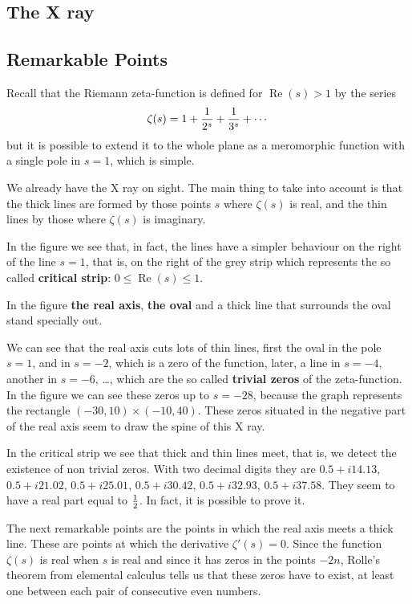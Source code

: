 \documentclass[a4paper]{amsart}
\numberwithin{equation}{section}
\def\Re{\operatorname{\text{Re}}}
\begin{document}
\begin{large}
\section{The X ray}

\subsection{Remarkable Points} 
Recall that the Riemann zeta-function is defined
for
$\Re (s) >1$ by the series
$$\zeta(s)=1+{1\over 2^s}+{1\over 3^s}+\cdots$$
but it is possible to extend it to the whole plane as a meromorphic function
with a single pole in $s=1$, which is simple.

We already have the X ray on sight. The main thing to take into account
is that the thick lines are formed by those points $s$ where $\zeta
(s)$ is real, and the thin lines by those where $\zeta(s)$ is imaginary.

In the figure we see that, in fact, the lines have a simpler behaviour on the
right of the line $s=1$, that is, on the right of the grey strip which
represents the so called {\bf critical strip}: $0\leq \Re (s) \leq 1$.

In the figure {\bf the real axis}, {\bf the oval} and a thick line that
surrounds the oval stand specially out.

We can see that the real axis cuts lots of thin lines, first the oval
in the pole $s=1$, and in $s=-2$, which is a zero of the function, later, a
line in $s=-4$, another in $s=-6$, \dots, which are the so called {\bf trivial
zeros} of the zeta-function. In the figure we can see these zeros up to $s=-28$,
because the graph represents the rectangle $(-30, 10)\times (-10, 40)$. These
zeros situated in the negative part of the real axis seem to draw the spine of
this X ray.

In the critical strip we see that thick and thin lines meet, that is, we detect
the existence of non trivial zeros. With two decimal digits they are $0.5+ i 14.13$, $0.5 + i 21.02$,
$0.5+i 25.01$, $0.5 + i 30.42$,
$0.5+i 32.93$, $ 0.5+i 37.58$. 
They seem to have a real part equal to ${1 \over 2}$. In fact, it is
possible to prove it.
\medskip

The next remarkable points are the points in which the real axis meets a thick
line. These are points at which the derivative $\zeta'(s)=0$. Since the function
$\zeta(s)$ is real when $s$ is real and since it has zeros in the points $-2n$,
Rolle's theorem from elemental calculus tells us that these zeros have to exist,
at least one between each pair of consecutive even numbers.


\end{large}
\end{document}

